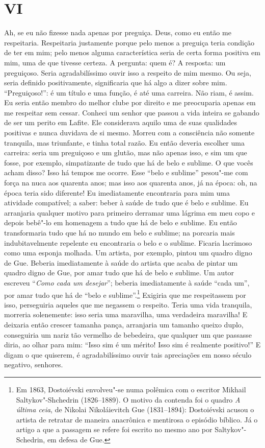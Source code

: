 \section{VI}

Ah, se eu não fizesse nada apenas por preguiça. Deus, como eu então me
respeitaria. Respeitaria justamente porque pelo menos a preguiça teria condição
de ter em mim; pelo menos alguma característica seria de certa forma positiva
em mim, uma de que tivesse certeza. A pergunta: quem é?  A resposta: um
preguiçoso. Seria agradabilíssimo ouvir isso a respeito de mim mesmo. Ou seja,
seria definido positivamente, significaria que há algo a dizer sobre mim.
“Preguiçoso!”: é um título e uma função, é até uma carreira. Não riam, é assim.
Eu seria então membro do melhor clube por direito e me preocuparia apenas em me
respeitar sem cessar.  Conheci um senhor que passou a vida inteira se gabando
de ser um perito em Lafite. Ele considerava aquilo uma de suas qualidades
positivas e nunca duvidava de si mesmo. Morreu com a consciência não somente
tranquila, mas triunfante, e tinha total razão. Eu então deveria escolher uma
carreira: seria um preguiçoso e um glutão, mas não apenas isso, e sim um que
fosse, por exemplo, simpatizante de tudo que há de belo e sublime. O que vocês
acham disso? Isso há tempos me ocorre. Esse “belo e sublime” pesou"-me com força
na nuca aos quarenta anos; mas isso aos quarenta anos, já na época: oh, na
época teria sido diferente! Eu imediatamente encontraria para mim uma atividade
compatível; a saber: beber à saúde de tudo que é belo e sublime. Eu arranjaria
qualquer motivo para primeiro derramar uma lágrima em meu copo e depois bebê"-lo
em homenagem a tudo que há de belo e sublime. Eu então transformaria tudo que
há no mundo em belo e sublime; na porcaria mais indubitavelmente repelente eu
encontraria o belo e o sublime. Ficaria lacrimoso como uma esponja molhada. Um
artista, por exemplo, pintou um quadro digno de Gue. Beberia imediatamente à
saúde do artista que acaba de pintar um quadro digno de Gue, por amar tudo que
há de belo e sublime. Um autor escreveu “\textit{Como cada um desejar}”;
beberia imediatamente à saúde “cada um”, por amar tudo que há de “belo e
sublime”.\footnote{ Em 1863, Dostoiévski envolveu"-se numa polêmica com o
escritor Mikhail Saltykov"-Shchedrin (1826--1889). O motivo da contenda foi o
quadro \textit{A última ceia}, de Nikolai Nikoláievitch Gue (1831--1894):
Dostoiévski acusou o artista de retratar de maneira anacrônica e mentirosa o
episódio bíblico. Já o artigo a que a passagem se refere foi escrito no mesmo
ano por Saltykov"-Schedrin, em defesa de Gue.} Exigiria que me respeitassem por
isso, perseguiria aqueles que me negassem o respeito.  Teria uma vida
tranquila, morreria solenemente: isso seria uma maravilha, uma verdadeira
maravilha! E deixaria então crescer tamanha pança, arranjaria um tamanho queixo
duplo, conseguiria um nariz tão vermelho de bebedeira, que qualquer um que
passasse diria, ao olhar para mim: “Isso sim é um mérito! Isso sim é realmente
positivo!” E digam o que quiserem, é agradabilíssimo ouvir tais apreciações em
nosso século negativo, senhores.


